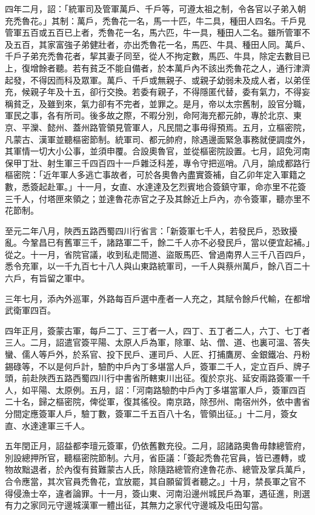 \begin{pinyinscope}
 四年二月，詔：「統軍司及管軍萬戶、千戶等，可遵太祖之制，令各官以子弟入朝充禿魯花。」其制：萬戶，禿魯花一名，馬一十匹，牛二具，種田人四名。千戶見管軍五百或五百已上者，禿魯花一名，馬六匹，牛一具，種田人二名。雖所管軍不及五百，其家富強子弟健壯者，亦出禿魯花一名，馬匹、牛具、種田人同。萬戶、千戶子弟充禿魯花者，挈其妻子同至，從人不拘定數，馬匹、牛具，除定去數目已上，復增餘者聽。若有貧乏不能自備者，於本萬戶內不該出禿魯花之人，通行津濟起發，不得因而科及眾軍。萬戶、千戶或無親子、或親子幼弱未及成人者，以弟侄充，候親子年及十五，卻行交換。若委有親子，不得隱匿代替，委有氣力，不得妄稱貧乏，及雖到來，氣力卻有不完者，並罪之。是月，帝以太宗舊制，設官分職，軍民之事，各有所司。後多故之際，不暇分別，命阿海充都元帥，專於北京、東京、平灤、懿州、蓋州路管領見管軍人，凡民間之事毋得預焉。五月，立樞密院，凡蒙古、漢軍並聽樞密節制。統軍司、都元帥府，除遇邊面緊急事務就便調度外，其軍情一切大小公事，並須申覆。合設奧魯官，並從樞密院設置。七月，詔免河南保甲丁壯、射生軍三千四百四十一戶雜泛科差，專令守把巡哨。八月，諭成都路行樞密院：「近年軍人多逃亡事故者，可於各奧魯內盡實簽補，自乙卯年定入軍籍之數，悉簽起赴軍。」十一月，女直、水達達及乞烈賓地合簽鎮守軍，命亦里不花簽三千人，付塔匣來領之；並達魯花赤官之子及其餘近上戶內，亦令簽軍，聽亦里不花節制。



 至元二年八月，陜西五路西蜀四川行省言：「新簽軍七千人，若發民戶，恐致擾亂。今鞏昌已有舊軍三千，諸路軍二千，餘二千人亦不必發民戶，當以便宜起補。」從之。十一月，省院官議，收到私走間道、盜販馬匹、曾過南界人三千八百四戶，悉令充軍，以一千九百七十八人與山東路統軍司，一千人與蔡州萬戶，餘八百二十六戶，有旨留之軍中。



 三年七月，添內外巡軍，外路每百戶選中產者一人充之，其賦令餘戶代輸，在都增武衛軍四百。



 四年正月，簽蒙古軍，每戶二丁、三丁者一人，四丁、五丁者二人，六丁、七丁者三人。二月，詔遣官簽平陽、太原人戶為軍，除軍、站、僧、道、也裏可溫、答失蠻、儒人等戶外，於系官、投下民戶、運司戶、人匠、打捕鷹房、金銀鐵冶、丹粉錫碌等，不以是何戶計，驗酌中戶內丁多堪當人戶，簽軍二千人，定立百戶、牌子頭，前赴陜西五路西蜀四川行中書省所轄東川出征。復於京兆、延安兩路簽軍一千人，如平陽、太原例。五月，詔：「河南路驗酌中戶內丁多堪當軍人戶，簽軍四百二十名，歸之樞密院，俾從軍，復其徭役。南京路，除邳州、南宿州外，依中書省分間定應簽軍人戶，驗丁數，簽軍二千五百八十名，管領出征。」十二月，簽女直、水達達軍三千人。



 五年閏正月，詔益都李璮元簽軍，仍依舊數充役。二月，詔諸路奧魯毋隸總管府，別設總押所官，聽樞密院節制。六月，省臣議：「簽起禿魯花官員，皆已遷轉，或物故黜退者，於內復有貧難蒙古人氏，除隨路總管府達魯花赤、總管及掌兵萬戶，合令應當，其次官員禿魯花，宜放罷，其自願留質者聽之。」十月，禁長軍之官不得侵漁士卒，違者論罪。十一月，簽山東、河南沿邊州城民戶為軍，遇征進，則選有力之家同元守邊城漢軍一體出征，其無力之家代守邊城及屯田勾當。




\end{pinyinscope}
